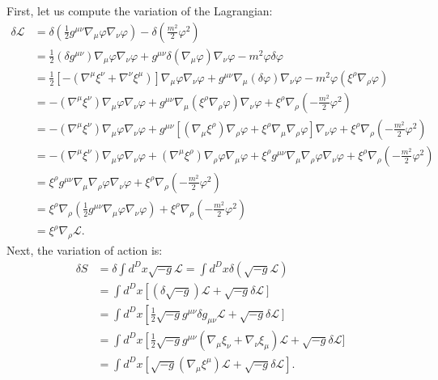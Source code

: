\begin{solution}[26.1]
	First, let us compute the variation of the Lagrangian:
	\[
	\begin{aligned}\delta\mathcal{L}&=\delta\left(\frac{1}{2}g^{\mu\nu}\nabla_\mu\varphi\nabla_\nu\varphi\right)-\delta\left(\frac{m^2}{2}\varphi^2\right)\\&=\frac{1}{2}(\delta g^{\mu\nu})\nabla_\mu\varphi\nabla_\nu\varphi+g^{\mu\nu}\delta(\nabla_\mu\varphi)\nabla_\nu\varphi-m^2\varphi\delta\varphi\\&=\frac{1}{2}{\left[-(\nabla^\mu\xi^\nu+\nabla^\nu\xi^\mu)\right]}\nabla_\mu\varphi\nabla_\nu\varphi+g^{\mu\nu}\nabla_\mu(\delta\varphi)\nabla_\nu\varphi-m^2\varphi(\xi^\rho\nabla_\rho\varphi)\\&=-(\nabla^\mu\xi^\nu)\nabla_\mu\varphi\nabla_\nu\varphi+g^{\mu\nu}\nabla_\mu(\xi^\rho\nabla_\rho\varphi)\nabla_\nu\varphi+\xi^\rho\nabla_\rho\left(-\frac{m^2}{2}\varphi^2\right)\\&=-(\nabla^\mu\xi^\nu)\nabla_\mu\varphi\nabla_\nu\varphi+g^{\mu\nu}\left[(\nabla_\mu\xi^\rho)\nabla_\rho\varphi+\xi^\rho\nabla_\mu\nabla_\rho\varphi\right]\nabla_\nu\varphi+\xi^\rho\nabla_\rho\left(-\frac{m^2}{2}\varphi^2\right)\\&=-(\nabla^\mu\xi^\nu)\nabla_\mu\varphi\nabla_\nu\varphi+(\nabla^\mu\xi^\rho)\nabla_\rho\varphi\nabla_\mu\varphi+\xi^\rho g^{\mu\nu}\nabla_\mu\nabla_\rho\varphi\nabla_\nu\varphi+\xi^\rho\nabla_\rho\left(-\frac{m^2}{2}\varphi^2\right)\\&=\xi^\rho g^{\mu\nu}\nabla_\mu\nabla_\rho\varphi\nabla_\nu\varphi+\xi^\rho\nabla_\rho\left(-\frac{m^2}{2}\varphi^2\right)\\&=\xi^\rho\nabla_\rho{\left(\frac{1}{2}g^{\mu\nu}\nabla_\mu\varphi\nabla_\nu\varphi\right)}+\xi^\rho\nabla_\rho{\left(-\frac{m^2}{2}\varphi^2\right)}\\&=\xi^\rho\nabla_\rho\mathcal{L}.\end{aligned}
	\]
	Next, the variation of action is:
	\[
	\begin{aligned}\delta S&=\delta\int d^Dx\sqrt{-g}\mathcal{L}=\int d^Dx\delta(\sqrt{-g}\mathcal{L})\\&=\int d^Dx\left[(\delta\sqrt{-g})\mathcal{L}+\sqrt{-g}\left.\delta\mathcal{L}\right]\right.\\&=\int d^Dx{\left[\frac{1}{2}\sqrt{-g}\left.g^{\mu\nu}\delta g_{\mu\nu}\right.\mathcal{L}+\sqrt{-g}\left.\delta\mathcal{L}\right]\right.}\\&=\int d^Dx{\left[\frac{1}{2}\sqrt{-g}\right.}g^{\mu\nu}(\nabla_\mu\xi_\nu+\nabla_\nu\xi_\mu)\left.\mathcal{L}+\sqrt{-g}\right.\delta\mathcal{L}]\\&=\int d^Dx{\left[\sqrt{-g}\left(\nabla_\mu\xi^\mu\right)\mathcal{L}+\sqrt{-g}\delta\mathcal{L}\right]}.\end{aligned}
\]
\end{solution}
